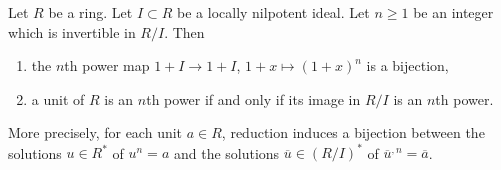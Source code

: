 \begin{lemma}
\label{editorial-source-lemma-lift-nth-roots}
Let $R$ be a ring. Let $I \subset R$ be a locally nilpotent ideal.
Let $n \geq 1$ be an integer which is invertible in $R/I$. Then
\begin{enumerate}
\item the $n$th power map $1 + I \to 1 + I$, $1 + x \mapsto (1 + x)^n$
is a bijection,
\item a unit of $R$ is an $n$th power if and only if its image in $R/I$
is an $n$th power.
\end{enumerate}
More precisely, for each unit $a\in R$, reduction induces a bijection
between the solutions $u\in R^*$ of $u^n=a$ and the solutions
$\overline u\in(R/I)^*$ of $\overline u^{,n}=\overline a$.
\end{lemma}

